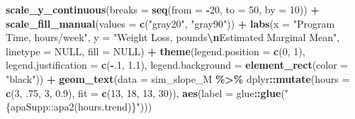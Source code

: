\documentclass[
]{article}
\newenvironment{Shaded}{\begin{snugshade}}{\end{snugshade}}
\newcommand{\AttributeTok}[1]{\textcolor[rgb]{0.13,0.29,0.53}{#1}}
\newcommand{\ConstantTok}[1]{\textcolor[rgb]{0.56,0.35,0.01}{#1}}
\newcommand{\DecValTok}[1]{\textcolor[rgb]{0.00,0.00,0.81}{#1}}
\newcommand{\FloatTok}[1]{\textcolor[rgb]{0.00,0.00,0.81}{#1}}
\newcommand{\FunctionTok}[1]{\textcolor[rgb]{0.13,0.29,0.53}{\textbf{#1}}}
\newcommand{\NormalTok}[1]{#1}
\newcommand{\SpecialCharTok}[1]{\textcolor[rgb]{0.81,0.36,0.00}{\textbf{#1}}}
\newcommand{\StringTok}[1]{\textcolor[rgb]{0.31,0.60,0.02}{#1}}
\begin{document}
\begin{Shaded}
\begin{Highlighting}[]
  \FunctionTok{scale\_y\_continuous}\NormalTok{(}\AttributeTok{breaks =} \FunctionTok{seq}\NormalTok{(}\AttributeTok{from =} \SpecialCharTok{{-}}\DecValTok{20}\NormalTok{, }\AttributeTok{to =} \DecValTok{50}\NormalTok{, }\AttributeTok{by =} \DecValTok{10}\NormalTok{)) }\SpecialCharTok{+}
  \FunctionTok{scale\_fill\_manual}\NormalTok{(}\AttributeTok{values =} \FunctionTok{c}\NormalTok{(}\StringTok{"gray20"}\NormalTok{, }\StringTok{"gray90"}\NormalTok{)) }\SpecialCharTok{+}
  \FunctionTok{labs}\NormalTok{(}\AttributeTok{x =} \StringTok{"Program Time, hours/week"}\NormalTok{,}
       \AttributeTok{y =} \StringTok{"Weight Loss, pounds}\SpecialCharTok{\textbackslash{}n}\StringTok{Estimated Marginal Mean"}\NormalTok{,}
       \AttributeTok{linetype =} \ConstantTok{NULL}\NormalTok{,}
       \AttributeTok{fill =} \ConstantTok{NULL}\NormalTok{)  }\SpecialCharTok{+}
  \FunctionTok{theme}\NormalTok{(}\AttributeTok{legend.position =} \FunctionTok{c}\NormalTok{(}\DecValTok{0}\NormalTok{, }\DecValTok{1}\NormalTok{),}
        \AttributeTok{legend.justification =} \FunctionTok{c}\NormalTok{(}\SpecialCharTok{{-}}\NormalTok{.}\DecValTok{1}\NormalTok{, }\FloatTok{1.1}\NormalTok{),}
        \AttributeTok{legend.background =} \FunctionTok{element\_rect}\NormalTok{(}\AttributeTok{color =} \StringTok{"black"}\NormalTok{)) }\SpecialCharTok{+}
  \FunctionTok{geom\_text}\NormalTok{(}\AttributeTok{data =}\NormalTok{ sim\_slope\_M }\SpecialCharTok{\%\textgreater{}\%} 
\NormalTok{              dplyr}\SpecialCharTok{::}\FunctionTok{mutate}\NormalTok{(}\AttributeTok{hours =} \FunctionTok{c}\NormalTok{(}\DecValTok{3}\NormalTok{, .}\DecValTok{75}\NormalTok{, }\DecValTok{3}\NormalTok{, }\FloatTok{0.9}\NormalTok{),}
                            \AttributeTok{fit =} \FunctionTok{c}\NormalTok{(}\DecValTok{13}\NormalTok{, }\DecValTok{18}\NormalTok{, }\DecValTok{13}\NormalTok{, }\DecValTok{30}\NormalTok{)),}
            \FunctionTok{aes}\NormalTok{(}\AttributeTok{label =}\NormalTok{ glue}\SpecialCharTok{::}\FunctionTok{glue}\NormalTok{(}\StringTok{"\{apaSupp::apa2(hours.trend)\}"}\NormalTok{)))}
\end{Highlighting}
\end{Shaded}
\end{document}
